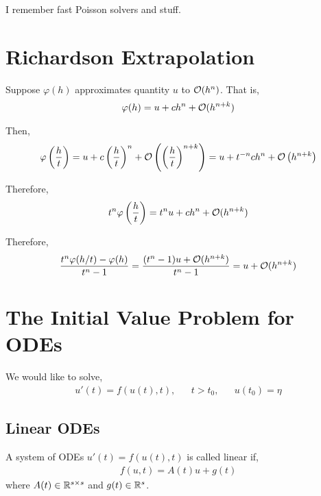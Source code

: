 \documentclass[12pt]{article}
\begin{document}
I remember fast Poisson solvers and stuff.

{}


\section{Richardson Extrapolation}

Suppose \( \varphi(h) \) approximates quantity \( u \) to \( \mathcal{O}(h^n) \). That is,
\begin{align*}
    \varphi(h) = u + c h^n + \mathcal{O}(h^{n+k})
\end{align*}

Then,
\begin{align*}
    \varphi \left( \frac{h}{t} \right) = u + c \left( \frac{h}{t} \right)^n + \mathcal{O} \left( \left( \frac{h}{t} \right)^{n+k} \right)
    = u + t^{-n} c h^n + \mathcal{O}\left( h^{n+k} \right)
\end{align*}

Therefore,
\begin{align*}
    t^n \varphi \left( \frac{h}{t} \right) = t^n u + c h^n + \mathcal{O}(h^{n+k})
\end{align*}


Therefore,
\begin{align*}
    \frac{t^n \varphi(h/t) - \varphi(h)}{t^n-1} 
    = \frac{(t^n-1)u + \mathcal{O}(h^{n+k})}{t^n-1}
    = u + \mathcal{O}(h^{n+k})
\end{align*}



\section{The Initial Value Problem for ODEs}

We would like to solve,
\begin{align*}
    u'(t) = f(u(t),t), && t>t_0, && u(t_0) = \eta
\end{align*}

\subsection{Linear ODEs}

\begin{definition}
A system of ODEs \( u'(t) = f(u(t),t) \) is called linear if,
\begin{align*}
    f(u,t) = A(t) u + g(t)
\end{align*}
where \( A(t) \in \mathbb{R}^{s\times s} \) and \( g(t)\in\mathbb{R}^s \).
\end{definition}
\end{document}
